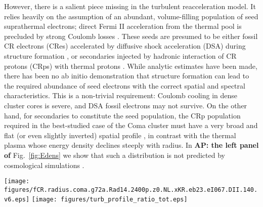 \documentclass[useAMS,usenatbib]{mn2e}
\def\AP#1{{\bf  AP: #1}}
\begin{document}
However, there is a salient piece missing in the turbulent
reacceleration model. It relies heavily on the assumption of an
abundant, volume-filling population of seed suprathermal electrons;
direct Fermi II acceleration from the thermal pool is precluded by
strong Coulomb losses
\citep{2008ApJ...682..175P,2012ApJ...759..113C}. These seeds are
presumed to be either fossil CR electrons (CRes) accelerated by
diffusive shock acceleration (DSA) during structure formation
\citep{1999ApJ...520..529S}, or secondaries injected by hadronic
interaction of CR protons (CRps) with thermal protons
\citep{brunetti11}. While analytic estimates have been made, there has
been no ab initio demonstration that structure formation can lead to
the required abundance of seed electrons with the correct spatial and
spectral characteristics. This is a non-trivial requirement: Coulomb
cooling in dense cluster cores is severe, and DSA fossil electrons may
not survive. On the other hand, for secondaries to constitute the seed
population, the CRp population required in the best-studied case of
the Coma cluster must have a very broad and flat (or even slightly
inverted) spatial profile \citep{brunetti12}, in contrast with the
thermal plasma whose energy density declines steeply with radius. In
\AP{the left panel of} Fig.~\ref{fig:Edens} we show that such a
distribution is not predicted by cosmological simulations \cite[see
  also][]{pinzke10,2014MNRAS.439.2662V}.
\begin{figure*}
  \texttt{[image: figures/fCR.radius.coma.g72a.Rad14.2400p.z0.NL.xKR.eb23.eI067.DII.140.v6.eps]}
  \texttt{[image: figures/turb\_profile\_ratio\_tot.eps]}
  \caption{Left: spatial distribution of CRp energy density in the
    Coma cluster. The red dash-dotted line shows the required
    distribution of seed CRps that generate secondary electrons via
    p-p collisions required to reproduce Coma radio brightness
    observations after Fermi-II reacceleration \citep{brunetti12}. The
    blue solid line shows the distribution of fossil CRps found in
    cosmological simulations, which disagrees with the required
    profile. \AP{To better compare the two models in this figure, we
      normalize the required distribution of CRps by fixing the total
      CRp energy $E_\rmn{CR}$ to 0.3 percent of the total thermal
      energy, consistent with observations
      \citep{2014ApJ...787...18A,2012ApJ...757..123A}. Right: the
      ratio of turbulent-to-thermal energy densities (solid lines) and
      cumulative energies (dotted lines) in our three models. The
      energy densities are parametrized as $\epsilon_\rmn{turb}
      \propto \epsilon_\rmn{th}^{(\alpha_{\rmn{tu}}+1)/2}/T^{1/4}$ and
      normalized such that the total turbulent energy in compressible
      modes $E_\rmn{turb}$ for each scenario makes up about 6\% of the
      total thermal energy $E_\rmn{th}$ inside the radio halo
      ($R_\rmn{RH}\approx0.6R_{200}$). The turbulent profiles explore
      the uncertainty in the cluster turbulence and are motivated by
      the cosmological simulation in
      \citep{2009ApJ...705.1129L,2010ApJ...725.1452S,2011A&A...529A..17V}.}}
  \label{fig:Edens}
\end{figure*}
\end{document}
